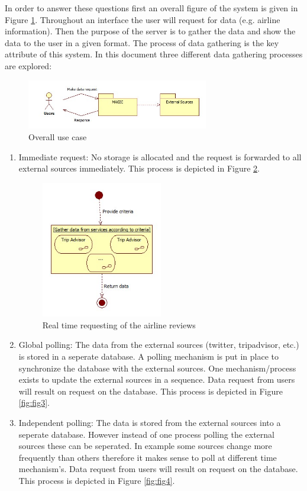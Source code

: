 \documentclass{article}
\begin{document}
In order to answer these questions first an overall figure of the system is given in Figure \ref{fig:fig1}. 
Throughout an interface the user will request for data (e.g. airline information). Then the purpose of the server is to gather
the data and show the data to the user in a given format. The process of data gathering is the key attribute of this system.
In this document three different data gathering processes are explored:

\begin{figure}[!]
\centering
\includegraphics[width=300px]{UserRequestingData}
\caption{Overall use case}
\label{fig:fig1}
\end{figure}

\begin{enumerate}
\item Immediate request: No storage is allocated and the request is forwarded to all external sources immediately. This process is depicted in Figure \ref{fig:fig2}.  

\begin{figure}[!htbp]
\centering
\includegraphics[width=200px]{Realtime}
\caption{Real time requesting of the airline reviews}
\label{fig:fig2}
\end{figure}

\item Global polling: The data from the external sources (twitter, tripadvisor, etc.) is stored in a seperate database. A polling mechanism is put in place to synchronize the database with the external sources. One mechanism/process exists to update the external sources in a sequence. Data request from users will result on request on the database. This process is depicted in Figure \ref{fig:fig3}.  
\item Independent polling: The data is stored from the external sources into a seperate database. However instead of one process polling the external sources these can be seperated. In example some sources change more frequently than others therefore it makes sense to poll at different time mechanism's. Data request from users will result on request on the database. This process is depicted in Figure \ref{fig:fig4}.  
\end{enumerate}
\end{document}
